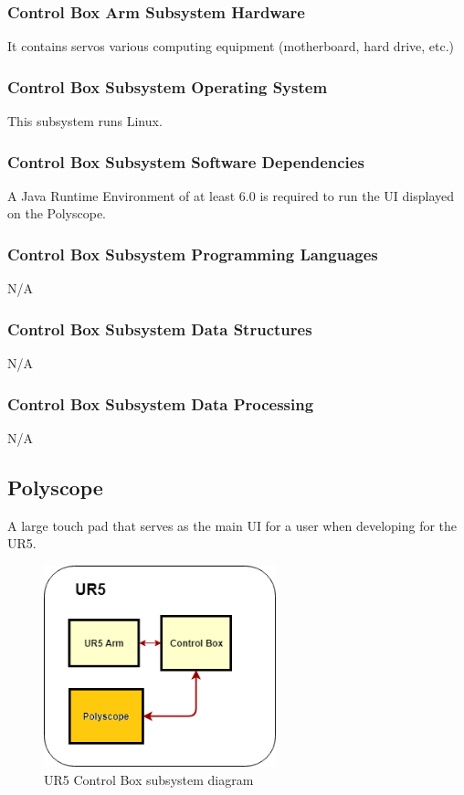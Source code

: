 \subsubsection{Control Box Arm Subsystem Hardware}
It contains servos various computing equipment (motherboard, hard drive, etc.)

\subsubsection{Control Box Subsystem Operating System}
This subsystem runs Linux.

\subsubsection{Control Box Subsystem Software Dependencies}
A Java Runtime Environment of at least 6.0 is required to run the UI displayed on the Polyscope.

\subsubsection{Control Box Subsystem Programming Languages}
N/A

\subsubsection{Control Box Subsystem Data Structures}
N/A

\subsubsection{Control Box Subsystem Data Processing}
N/A

\subsection{Polyscope}
A large touch pad that serves as the main UI for a user when developing for the UR5.

\begin{figure}[h!]
	\centering
 	\includegraphics[width=0.60\textwidth]{images/UR5_Layer_Polyscope}
 \caption{UR5 Control Box subsystem diagram}
\end{figure}

